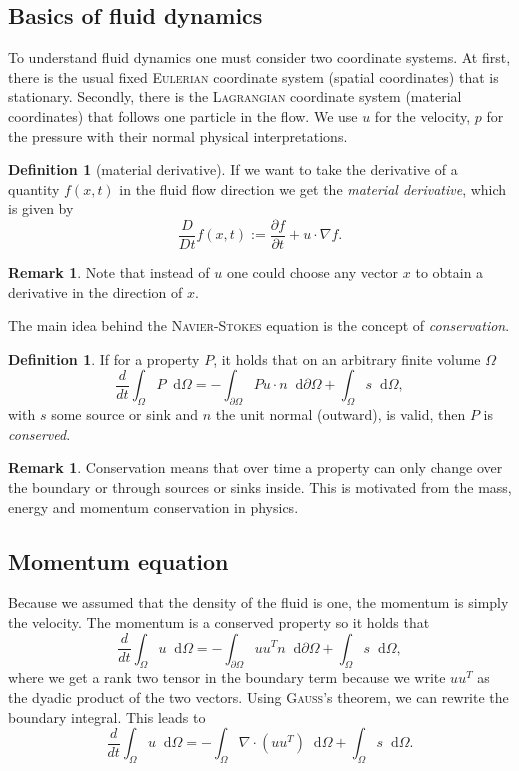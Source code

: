 \documentclass[12pt,a4paper,twoside, open=right]{scrreprt}
\theoremstyle{definition}
\newtheorem{rem}[auf]{Remark}
\newtheorem{defn}[auf]{Definition}
\theoremstyle{plain}
\newcommand{\D}{\mathop{}\!\mathrm{d}}
\begin{document}
\subsection{Basics of fluid dynamics}
To understand fluid dynamics one must consider two coordinate systems. At first, there is the usual fixed \textsc{Eulerian} coordinate system (spatial coordinates) that is stationary. Secondly, there is the \textsc{Lagrangian} coordinate system (material coordinates) that follows one particle in the flow. 
We use $u$ for the velocity, $p$ for the pressure with their normal physical interpretations.
\begin{defn}[material derivative]
    If we want to take the derivative of a quantity $f(x,t)$ in the fluid flow direction we get the \emph{material derivative}, which is given by 
    \begin{equation}
        \frac{D}{Dt}f(x,t):=\frac{\partial f}{\partial t} + u\cdot\nabla f.
    \end{equation}
\end{defn}
\begin{rem}
    Note that instead of $u$ one could choose any vector $x$ to obtain a derivative in the direction of $x$.
\end{rem}
The main idea behind the \textsc{Navier-Stokes} equation is the concept of \emph{conservation}. 
\begin{defn}
    If for a property $P$, it holds that on an arbitrary finite volume $\Omega$
    \begin{equation}
        \frac{d}{dt}\int_\Omega P\D\Omega = -\int_{\partial\Omega}Pu\cdot n\D\partial\Omega+\int_\Omega s\D\Omega,\label{eq:conservation}
    \end{equation}
   with $s$ some source or sink and $n$ the unit normal (outward), is valid, then $P$ is \emph{conserved}.
\end{defn}
\begin{rem}
    Conservation means that over time a property can only change over the boundary or through sources or sinks inside. This is motivated from the mass, energy and momentum conservation in physics.
\end{rem}
\subsection{Momentum equation}
Because we assumed that the density of the fluid is one, the momentum is simply the velocity. The momentum is a conserved property so it holds that
\begin{equation}
    \frac{d}{dt}\int_\Omega u\D\Omega = -\int_{\partial\Omega}uu^Tn\D\partial\Omega +\int_\Omega s\D\Omega,
\end{equation} where we get a rank two tensor in the boundary term because we write $uu^T$ as the dyadic product of the two vectors. Using \textsc{Gauß}'s theorem, we can rewrite the boundary integral. This leads to 
\begin{equation}
    \frac{d}{dt}\int_\Omega u\D\Omega = -\int_\Omega \nabla\cdot(uu^T)\D\Omega +\int_\Omega s\D\Omega.
\end{equation}
\end{document}
